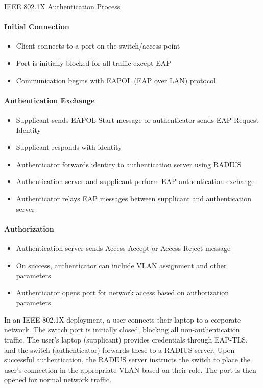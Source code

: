 \begin{KR}{IEEE 802.1X Authentication Process}\\
\paragraph{Initial Connection}
\begin{itemize}
    \item Client connects to a port on the switch/access point
    \item Port is initially blocked for all traffic except EAP
    \item Communication begins with EAPOL (EAP over LAN) protocol
\end{itemize}

\paragraph{Authentication Exchange}
\begin{itemize}
    \item Supplicant sends EAPOL-Start message or authenticator sends EAP-Request Identity
    \item Supplicant responds with identity
    \item Authenticator forwards identity to authentication server using RADIUS
    \item Authentication server and supplicant perform EAP authentication exchange
    \item Authenticator relays EAP messages between supplicant and authentication server
\end{itemize}

\paragraph{Authorization}
\begin{itemize}
    \item Authentication server sends Access-Accept or Access-Reject message
    \item On success, authenticator can include VLAN assignment and other parameters
    \item Authenticator opens port for network access based on authorization parameters
\end{itemize}
\end{KR}

\begin{example}
In an IEEE 802.1X deployment, a user connects their laptop to a corporate network. The switch port is initially closed, blocking all non-authentication traffic. The user's laptop (supplicant) provides credentials through EAP-TLS, and the switch (authenticator) forwards these to a RADIUS server. Upon successful authentication, the RADIUS server instructs the switch to place the user's connection in the appropriate VLAN based on their role. The port is then opened for normal network traffic.
\end{example}

